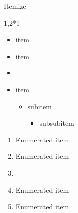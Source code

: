 \documentclass[english,aspectratio=43,t]{beamer}
\begin{document}
\begin{frame}{Itemize}
	\begin{cols}{1,2*1}
		\begin{itemize}
		\item item
		\item item
		\item []
		\item item
			\begin{itemize}
			\item subitem
				\begin{itemize}
				\item subsubitem
				\end{itemize}
			\end{itemize}
		\end{itemize}
	\col
		\begin{enumerate}
		\item Enumerated item
		\item Enumerated item
		\item[]
		\item Enumerated item
		\item Enumerated item
		\end{enumerate}
	\end{cols}

	\vspace{1em}


\end{frame}
\end{document}
